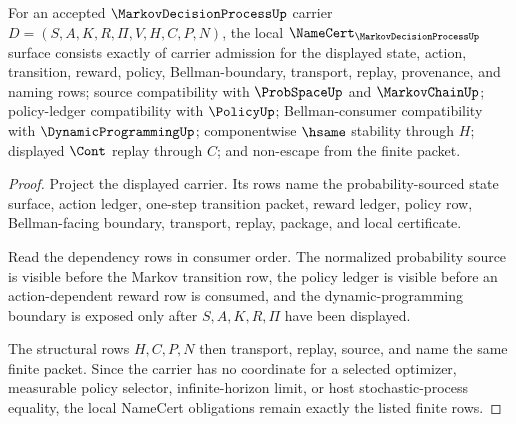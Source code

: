 \begin{theorem}
\label{thm:markov-decision-process-namecert-obligations}
For an accepted $\MarkovDecisionProcessUp$ carrier $D=(S,A,K,R,\Pi,V,H,C,P,N)$, the local $\NameCert_{\MarkovDecisionProcessUp}$ surface consists exactly of carrier admission for the displayed state, action, transition, reward, policy, Bellman-boundary, transport, replay, provenance, and naming rows; source compatibility with $\ProbSpaceUp$ and $\MarkovChainUp$; policy-ledger compatibility with $\PolicyUp$; Bellman-consumer compatibility with $\DynamicProgrammingUp$; componentwise $\hsame$ stability through $H$; displayed $\Cont$ replay through $C$; and non-escape from the finite packet.
\end{theorem}
\begin{proof}
Project the displayed carrier. Its rows name the probability-sourced state surface, action ledger, one-step transition packet, reward ledger, policy row, Bellman-facing boundary, transport, replay, package, and local certificate.

Read the dependency rows in consumer order. The normalized probability source is visible before the Markov transition row, the policy ledger is visible before an action-dependent reward row is consumed, and the dynamic-programming boundary is exposed only after $S,A,K,R,\Pi$ have been displayed.

The structural rows $H,C,P,N$ then transport, replay, source, and name the same finite packet. Since the carrier has no coordinate for a selected optimizer, measurable policy selector, infinite-horizon limit, or host stochastic-process equality, the local NameCert obligations remain exactly the listed finite rows.
\end{proof}

